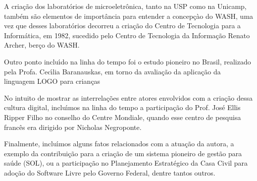 \documentclass[
12pt,		%
openright,	%
twoside,  %
a4paper,			%
chapter=TITLE,		%
english,			%
french,				%
spanish,			%
brazil				%
]{USPSC-classe/USPSC}
\begin{document}
A cria\c{c}\~ao dos laborat\'orios de microeletr\^onica, tanto na USP como na Unicamp, tamb\'em s\~ao elementos de import\^ancia para entender a concep\c{c}\`ao do WASH, uma vez que desses laborat\'orios decorreu a cria\c{c}\~ao do Centro de Tecnologia para a Inform\'atica, em 1982, sucedido pelo Centro de Tecnologia da Informa\c{c}\~ao Renato Archer, ber\c{c}o do WASH.

















Outro ponto inclu\'{\i}do na linha do tempo foi o estudo pioneiro no Brasil, realizado pela Profa. Cec\'{\i}lia Baranauskas, em torno da avalia\c{c}\~ao da aplica\c{c}\~ao da linguagem LOGO para crian\c{c}as

















No intuito de mostrar as interrela\c{c}\~oes entre atores envolvidos com a cria\c{c}\~ao dessa \textquotedbl cultura digital\textquotedbl , inclu\'{\i}mos na linha do tempo a participa\c{c}\~ao do Prof. Jos\'e Ellis Ripper Filho no conselho do Centre Mondiale, quando esse centro de pesquisa franc\^es era dirigido por Nicholas Negroponte.

















Finalmente, inclu\'{\i}mos alguns fatos relacionados com a atua\c{c}\~ao da autora, a exemplo da contribui\c{c}\~ao para a cria\c{c}\~ao de um sistema pioneiro de gest\~ao para sa\'ude (SOL), ou a participa\c{c}\~ao no Planejamento Estrat\'egico da Casa Civil para ado\c{c}\~ao do Software Livre pelo Governo Federal, dentre tantos outros.
\end{document}
